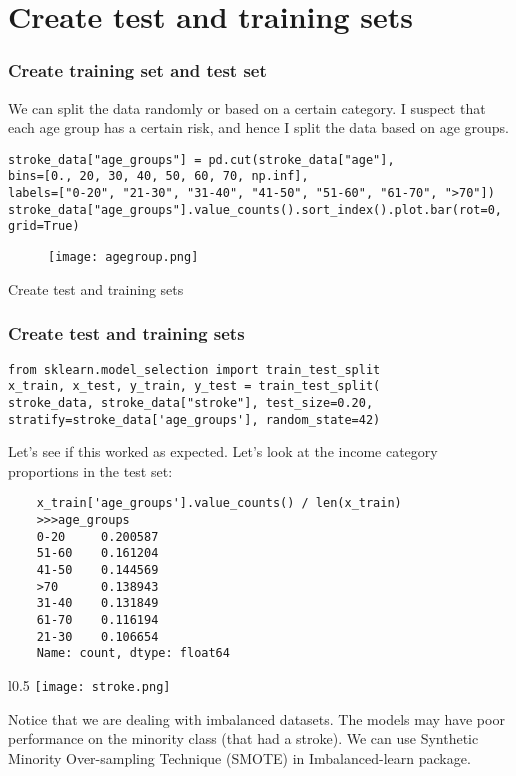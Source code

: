 \documentclass[10pt]{beamer}
\theoremstyle{definition}
\theoremstyle{remark}
\numberwithin{equation}{section}
\begin{document}
\section{Create test and training sets}
\begingroup
\footnotesize
\begin{frame}[fragile]
\frametitle{Create training set and test set}
We can split the data randomly or based on a certain category. I suspect that each age group has a certain risk, and hence I split the data based on age groups.
\begin{lstlisting}
stroke_data["age_groups"] = pd.cut(stroke_data["age"],
bins=[0., 20, 30, 40, 50, 60, 70, np.inf],
labels=["0-20", "21-30", "31-40", "41-50", "51-60", "61-70", ">70"])
stroke_data["age_groups"].value_counts().sort_index().plot.bar(rot=0, grid=True)
\end{lstlisting}

		\begin{figure}[h]
	\texttt{[image: agegroup.png]}
\end{figure}
\end{frame}
\endgroup 

\begin{frame}
	\centering Create test and training sets
\end{frame}

\begin{frame}[fragile]
	\frametitle{Create test and training sets}

\begin{lstlisting}
from sklearn.model_selection import train_test_split
x_train, x_test, y_train, y_test = train_test_split(
stroke_data, stroke_data["stroke"], test_size=0.20, stratify=stroke_data['age_groups'], random_state=42)
\end{lstlisting}
	
	Let’s see if this worked as expected. Let's look at the income
	category proportions in the test set:
	
\begin{lstlisting}
	x_train['age_groups'].value_counts() / len(x_train)
	>>>age_groups
	0-20     0.200587
	51-60    0.161204
	41-50    0.144569
	>70      0.138943
	31-40    0.131849
	61-70    0.116194
	21-30    0.106654
	Name: count, dtype: float64
\end{lstlisting}
\end{frame}


\begin{frame}
	\begin{wrapfigure}{l}{0.5\textwidth}
		\texttt{[image: stroke.png]}
	\end{wrapfigure}
	
Notice that we are dealing with imbalanced datasets. The models may have poor performance on the minority class (that had a stroke). We can use Synthetic Minority Over-sampling Technique (SMOTE) in Imbalanced-learn package.
\end{frame}
\end{document}
